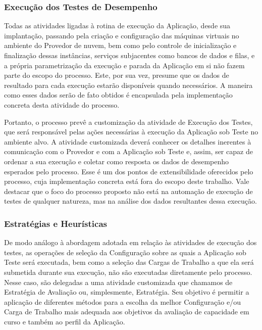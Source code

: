 \subsubsection{Execução dos Testes de Desempenho}
Todas as atividades ligadas à rotina de execução da Aplicação, desde sua implantação,
passando pela criação e configuração das máquinas virtuais no ambiente do Provedor 
de nuvem, bem como pelo controle de inicialização e finalização dessas instâncias, 
serviços subjacentes como bancos de dados e filas, e a própria parametrização da 
execução e parada da Aplicação em si não fazem parte do escopo do processo. Este,
por sua vez, presume que os dados de resultado para cada execução estarão disponíveis
quando necessários. A maneira como esses dados serão de fato obtidos é
encapsulada pela implementação concreta desta atividade do processo.


Portanto, o processo prevê a customização da atividade de Execução dos Testes,
que será responsável pelas ações necessárias à execução da Aplicação sob Teste no ambiente
alvo. A atividade customizada deverá conhecer os detalhes inerentes à comunicação com 
o Provedor e com a Aplicação sob Teste e, assim, ser capaz de ordenar a sua execução e 
coletar como resposta os dados de desempenho esperados pelo processo. Esse é um dos 
pontos de extensibilidade oferecidos pelo processo, cuja implementação concreta está 
fora do escopo deste trabalho. Vale destacar que o foco do processo proposto não está na automação de execução de testes de qualquer natureza, mas na análise dos dados resultantes dessa execução.

\subsubsection{Estratégias e Heurísticas}
\label{subsubsec:heuristicas}
De modo análogo à abordagem adotada em relação às atividades de execução dos
testes, as operações de seleção da Configuração sobre as quais a Aplicação
sob Teste será executada, bem como a seleção das Cargas de Trabalho a que ela 
será submetida durante sua execução, não são executadas diretamente pelo processo.
Nesse caso, são delegadas a uma atividade customizada que chamamos de Estratégia de 
Avaliação ou, simplesmente, Estratégia. Seu objetivo é permitir a aplicação de 
diferentes métodos para a escolha da melhor Configuração e/ou Carga de Trabalho 
mais adequada aos objetivos da avaliação de capacidade em curso e também ao perfil 
da Aplicação.


